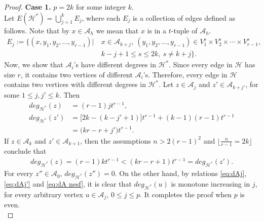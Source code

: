\documentclass[12pt,a4paper]{article}
\begin{document}
\begin{proof}
	\textbf{Case  1.} $ p=2k $ for some integer $ k $.\\
	Let $ E(\mathcal{H}^*)=\bigcup_{j=1}^{k}E_j $, where each
	$ E_j $ is a collection of edges defined as follows. Note that by $ x\in \mathcal{A}_h $ we mean that $ x $ is in a $ t $-tuple of $ \mathcal{A}_h $.
	\begin{align*}
	E_j:=\bigg\{ (x, y_1, y_2,\ldots, y_{r-1}) \big|\  &x\in \mathcal{A}_{k+j},\  (y_1,y_2,\ldots, y_{r-1})\in V^s_{1}\times V^s_{2}\times \cdots\times V^s_{r-1},\\
	& k-j+1\leq s\leq 2k,\ s\neq k+j
	\bigg\}.
	\end{align*}	
	Now, we show that $ \mathcal{A}_i $'s have different degrees in $ \mathcal{H}^* $. Since every edge in $ \mathcal{H} $ has size $ r $, it contains two vertices of different $ \mathcal{A}_i $'s.  Therefore, every edge in $ \mathcal{H} $ contains two vertices with different degrees in $ \mathcal{H}^* $.
	Let $ z\in \mathcal{A}_{j} $ and $ z'\in \mathcal{A}_{k+j'} $, for some $ 1\leq j,j'\leq k $. Then
	\begin{align}
	deg_{\mathcal{H}^*}(z)&=(r-1)jt^{r-1},\label{eq:dAj}\\
	deg_{\mathcal{H}^*}(z')&=\big[
	2k-(
	k-j'+1
	)
	\big]t^{r-1}
	+
	(k-1)
	(r-1)t^{r-1}\nonumber\\
	&=\big(kr-r+j'\big)t^{r-1}.\label{eq:dAj'}
	\end{align}
	If $ z\in \mathcal{A}_k $ and $ z'\in \mathcal{A}_{k+1} $, then the assumptions
	$ n>2(r-1)^2 $ and $ \lfloor\frac{n}{r-1}=2k\rfloor $ conclude that
	\begin{align}\label{eq:dA nesf}
	deg_{\mathcal{H}^*}(z)=(r-1)kt^{r-1}<(kr-r+1)t^{r-1}=deg_{\mathcal{H}^*}(z').
	\end{align}
	For every $ z''\in \mathcal{A}_0 $, $ deg_{\mathcal{H}^*}(z'')=0 $.  On the other hand, by relations
	\eqref{eq:dAj}, \eqref{eq:dAj'} and \eqref{eq:dA nesf}, it is clear that
	$ deg_{\mathcal{H}^*}(u) $ is monotone increasing in $ j $, for every arbitrary vertex $ u\in \mathcal{A}_j $,  $ 0\leq j \leq p $.  It completes the proof when $ p $ is even.\\
	

\end{proof}
\end{document}
